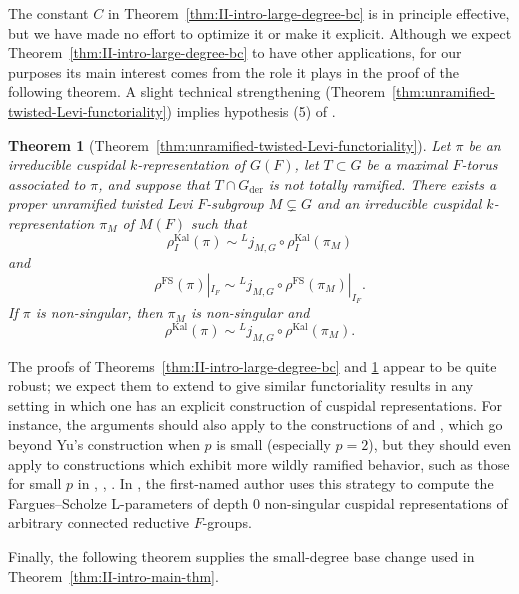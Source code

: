 \documentclass[reqno]{amsart}
\numberwithin{equation}{subsection}
\newcommand{\ld}{{}^L}
\DeclareMathOperator{\FS}{FS}
\DeclareMathOperator{\Kal}{Kal}
\DeclareMathOperator{\der}{der}
\newtheorem{thm}{Theorem}[subsection]
\theoremstyle{remark}
\numberwithin{equation}{subsection}
\numberwithin{figure}{subsection}
\begin{document}
The constant $C$ in Theorem~\ref{thm:II-intro-large-degree-bc} is in principle effective, but we have made no effort to optimize it or make it explicit. Although we expect Theorem~\ref{thm:II-intro-large-degree-bc} to have other applications, for our purposes its main interest comes from the role it plays in the proof of the following theorem. A slight technical strengthening (Theorem~\ref{thm:unramified-twisted-Levi-functoriality}) implies hypothesis (5) of \cite[Theorem~1.3.1]{CF26a}.

\begin{thm}[Theorem~\ref{thm:unramified-twisted-Levi-functoriality}]\label{thm:II-intro-unram-twisted-levi}
Let $\pi$ be an irreducible cuspidal $k$-representation of $G(F)$, let $T \subset G$ be a maximal $F$-torus associated to $\pi$, and suppose that $T \cap G_{\der}$ is not totally ramified. There exists a proper unramified twisted Levi $F$-subgroup $M \subsetneq G$ and an irreducible cuspidal $k$-representation $\pi_M$ of $M(F)$ such that
\begin{equation}\label{eqn:adlr-kaletha}
\rho_I^{\Kal}(\pi) \sim \ld j_{M,G} \circ \rho_I^{\Kal}(\pi_M)
\end{equation}
and
\begin{equation}\label{eqn:adlr-fs}
\rho^{\FS}(\pi)|_{I_F} \sim \ld j_{M,G} \circ \rho^{\FS}(\pi_M)|_{I_F}.
\end{equation}
If $\pi$ is non-singular, then $\pi_M$ is non-singular and
\[
\rho^{\Kal}(\pi) \sim \ld j_{M,G} \circ \rho^{\Kal}(\pi_M).
\]
\end{thm}

The proofs of Theorems~\ref{thm:II-intro-large-degree-bc} and \ref{thm:II-intro-unram-twisted-levi} appear to be quite robust; we expect them to extend to give similar functoriality results in any setting in which one has an explicit construction of cuspidal representations. For instance, the arguments should also apply to the constructions of \cite{FS25} and \cite{Tak26}, which go beyond Yu's construction when $p$ is small (especially $p = 2$), but they should even apply to constructions which exhibit more wildly ramified behavior, such as those for small $p$ in \cite{BK93}, \cite{SS08}, \cite{Ste08}. In \cite[\S 5]{Cot26b}, the first-named author uses this strategy to compute the Fargues--Scholze L-parameters of depth $0$ non-singular cuspidal representations of arbitrary connected reductive $F$-groups.


Finally, the following theorem supplies the small-degree base change used in Theorem~\ref{thm:II-intro-main-thm}.
\end{document}
